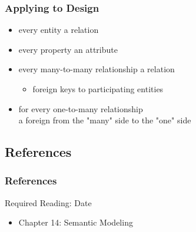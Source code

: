 \documentclass[dvipsnames]{beamer}
\begin{document}
\begin{frame}
  \frametitle{Applying to Design}

  \begin{itemize}
    \item every entity a relation

    \pause
    \item every property an attribute

    \pause
    \item every many-to-many relationship a relation
    \begin{itemize}
      \item foreign keys to participating entities
    \end{itemize}

    \pause
    \item for every one-to-many relationship\\a foreign from the
      "many" side to the "one" side
 \end{itemize}
\end{frame}

\subsection*{References}

\begin{frame}
  \frametitle{References}

  \begin{block}{Required Reading: Date}
    \begin{itemize}
      \item Chapter 14: \alert{Semantic Modeling}
    \end{itemize}
  \end{block}
\end{frame}
\end{document}
